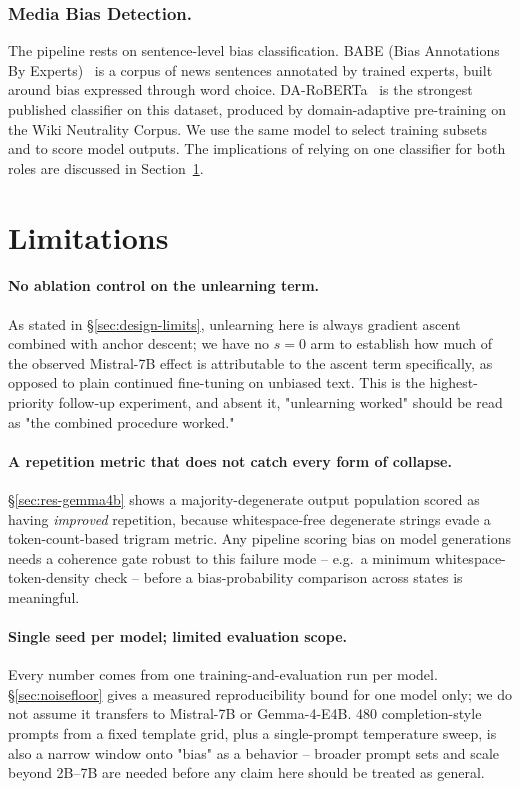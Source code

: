 \documentclass[runningheads]{llncs}
\begin{document}
\subsubsection{Media Bias Detection.}
The pipeline rests on sentence-level bias classification. BABE (Bias
Annotations By Experts)~\cite{spinde-etal-2021-neural-media} is a corpus
of news sentences annotated by trained experts, built around bias
expressed through word choice. DA-RoBERTa~\cite{krieger2022domain} is
the strongest published classifier on this dataset, produced by
domain-adaptive pre-training on the Wiki Neutrality Corpus. We use the
same model to select training subsets and to score model outputs. The
implications of relying on one classifier for both roles are discussed
in Section~\ref{sec:limitations}.



\section{Limitations}
\label{sec:limitations}

\paragraph{No ablation control on the unlearning term.} As stated in \S\ref{sec:design-limits}, unlearning here is always gradient ascent combined with anchor descent; we have no $s{=}0$ arm to establish how much of the observed Mistral-7B effect is attributable to the ascent term specifically, as opposed to plain continued fine-tuning on unbiased text. This is the highest-priority follow-up experiment, and absent it, "unlearning worked" should be read as "the combined procedure worked."

\paragraph{A repetition metric that does not catch every form of collapse.} \S\ref{sec:res-gemma4b} shows a majority-degenerate output population scored as having \emph{improved} repetition, because whitespace-free degenerate strings evade a token-count-based trigram metric. Any pipeline scoring bias on model generations needs a coherence gate robust to this failure mode -- e.g.\ a minimum whitespace-token-density check -- before a bias-probability comparison across states is meaningful.

\paragraph{Single seed per model; limited evaluation scope.} Every number comes from one training-and-evaluation run per model. \S\ref{sec:noisefloor} gives a measured reproducibility bound for one model only; we do not assume it transfers to Mistral-7B or Gemma-4-E4B. 480 completion-style prompts from a fixed template grid, plus a single-prompt temperature sweep, is also a narrow window onto "bias" as a behavior -- broader prompt sets and scale beyond 2B--7B are needed before any claim here should be treated as general.
\end{document}
